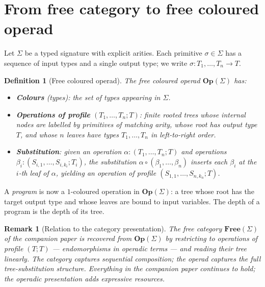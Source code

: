 \documentclass[11pt]{article}
\newtheorem{definition}{Definition}
\newtheorem{remark}{Remark}
\begin{document}
\section{From free category to free coloured operad}

Let $\Sigma$ be a typed signature with explicit arities. Each
primitive $\sigma \in \Sigma$ has a sequence of input types and a
single output type; we write $\sigma : T_1, \dots, T_n \to T$.

\begin{definition}[Free coloured operad]
The \emph{free coloured operad} $\mathbf{Op}(\Sigma)$ has:
\begin{itemize}[noitemsep,topsep=2pt]
  \item \textbf{Colours} (types): the set of types appearing in
        $\Sigma$.
  \item \textbf{Operations of profile} $(T_1, \dots, T_n; T)$: finite
        rooted trees whose internal nodes are labelled by primitives
        of matching arity, whose root has output type $T$, and whose
        $n$ leaves have types $T_1, \dots, T_n$ in left-to-right
        order.
  \item \textbf{Substitution}: given an operation $\alpha :
        (T_1, \dots, T_n; T)$ and operations $\beta_i : (S_{i,1},
        \dots, S_{i,k_i}; T_i)$, the substitution $\alpha
        \circ (\beta_1, \dots, \beta_n)$ inserts each $\beta_i$ at
        the $i$-th leaf of $\alpha$, yielding an operation of
        profile $(S_{1,1}, \dots, S_{n,k_n}; T)$.
\end{itemize}
\end{definition}

A \emph{program} is now a $1$-coloured operation in
$\mathbf{Op}(\Sigma)$: a tree whose root has the target output type
and whose leaves are bound to input variables. The depth of a program
is the depth of its tree.

\begin{remark}[Relation to the category presentation]
The free category $\mathbf{Free}(\Sigma)$ of the companion paper is
recovered from $\mathbf{Op}(\Sigma)$ by restricting to operations of
profile $(T; T)$ — endomorphisms in operadic terms — and reading
their tree linearly. The category captures sequential composition;
the operad captures the full tree-substitution structure. Everything
in the companion paper continues to hold; the operadic presentation
adds expressive resources.
\end{remark}
\end{document}
